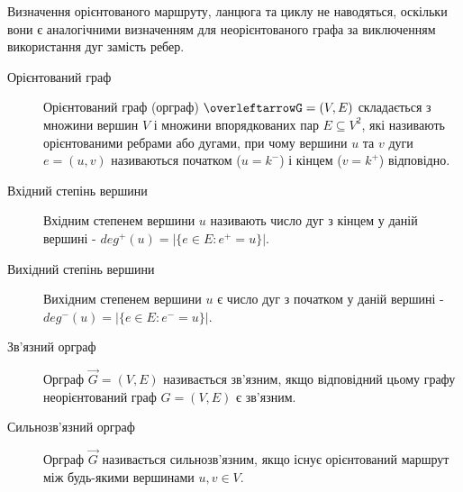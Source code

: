 
Визначення орієнтованого маршруту, ланцюга та циклу не наводяться, оскільки вони є аналогічними визначенням для неорієнтованого графа за виключенням використання дуг замість ребер.

\begin{description}
  \item[Орієнтований граф] Орієнтований граф (орграф) $\overleftarrowG=(V,E)$ складається з множини вершин $V$ і множини впорядкованих пар $E \subseteq V^2$, які називають орієнтованими ребрами або дугами, при чому вершини $u$ та $v$ дуги $e=(u,v)$ називаються початком ($u=k^-$) і кінцем ($v=k^+$) відповідно.
  \item[Вхідний степінь вершини] Вхідним степенем вершини $u$ називають число дуг з кінцем у даній вершині - $deg^+(u)=\vert\lbrace e \in E : e^+=u\rbrace \vert$.
  \item[Вихідний степінь вершини] Вихідним степенем вершини $u$ є число дуг з початком у даній вершині - $deg^-(u)=\vert \lbrace e \in E : e^-=u \rbrace \vert$.
  \item[Зв'язний орграф] Орграф $\overrightarrow G=(V,E)$ називається зв'язним, якщо відповідний цьому графу неорієнтований граф $G=(V,E)$ є зв'язним.
  \item[Сильнозв'язний орграф] Орграф $\overrightarrow G$ називається сильнозв'язним, якщо існує орієнтований маршрут між будь-якими вершинами $u,v \in V$.
\end{description}

